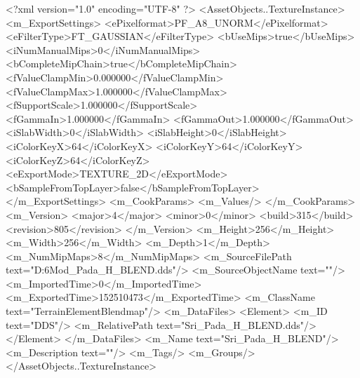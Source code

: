 <?xml version="1.0" encoding="UTF-8" ?>
<AssetObjects..TextureInstance>
	<m_ExportSettings>
		<ePixelformat>PF_A8_UNORM</ePixelformat>
		<eFilterType>FT_GAUSSIAN</eFilterType>
		<bUseMips>true</bUseMips>
		<iNumManualMips>0</iNumManualMips>
		<bCompleteMipChain>true</bCompleteMipChain>
		<fValueClampMin>0.000000</fValueClampMin>
		<fValueClampMax>1.000000</fValueClampMax>
		<fSupportScale>1.000000</fSupportScale>
		<fGammaIn>1.000000</fGammaIn>
		<fGammaOut>1.000000</fGammaOut>
		<iSlabWidth>0</iSlabWidth>
		<iSlabHeight>0</iSlabHeight>
		<iColorKeyX>64</iColorKeyX>
		<iColorKeyY>64</iColorKeyY>
		<iColorKeyZ>64</iColorKeyZ>
		<eExportMode>TEXTURE_2D</eExportMode>
		<bSampleFromTopLayer>false</bSampleFromTopLayer>
	</m_ExportSettings>
	<m_CookParams>
		<m_Values/>
	</m_CookParams>
	<m_Version>
		<major>4</major>
		<minor>0</minor>
		<build>315</build>
		<revision>805</revision>
	</m_Version>
	<m_Height>256</m_Height>
	<m_Width>256</m_Width>
	<m_Depth>1</m_Depth>
	<m_NumMipMaps>8</m_NumMipMaps>
	<m_SourceFilePath text="D:\Civ6Mod\Terrain\NW\SriPada\ARCHIVE\Sri_Pada_H_BLEND.dds"/>
	<m_SourceObjectName text=""/>
	<m_ImportedTime>0</m_ImportedTime>
	<m_ExportedTime>152510473</m_ExportedTime>
	<m_ClassName text="TerrainElementBlendmap"/>
	<m_DataFiles>
		<Element>
			<m_ID text="DDS"/>
			<m_RelativePath text="Sri_Pada_H_BLEND.dds"/>
		</Element>
	</m_DataFiles>
	<m_Name text="Sri_Pada_H_BLEND"/>
	<m_Description text=""/>
	<m_Tags/>
	<m_Groups/>
</AssetObjects..TextureInstance>

